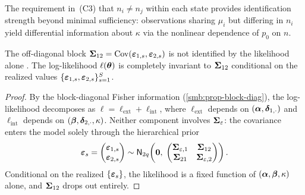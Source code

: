 \begin{remark}
\label{smb:rem-trial-variation}
  The requirement in~\textup{(C3)} that $n_i \ne n_j$ within each state
  provides identification strength beyond minimal sufficiency: observations
  sharing $\mu_i$ but differing in $n_i$ yield differential information
  about $\kappa$ via the nonlinear dependence of $p_0$ on $n$.
\end{remark}


\begin{proposition}\label{smb:prop-sigma12-nonid}
  The off-diagonal block
  $\boldsymbol{\Sigma}_{12} = \operatorname*{Cov}(\boldsymbol{\varepsilon}_{1,s}, \boldsymbol{\varepsilon}_{2,s})$ is not
  identified by the likelihood alone
  \citep[cf.~the analogous discussion
  in][Section~3.1]{GhosalEtAl2020}. The log-likelihood $\ell(\boldsymbol{\theta})$
  is completely invariant to $\boldsymbol{\Sigma}_{12}$ conditional on the realized
  values $\{\boldsymbol{\varepsilon}_{1,s}, \boldsymbol{\varepsilon}_{2,s}\}_{s=1}^S$.
\end{proposition}

\begin{proof}
  By the block-diagonal Fisher information
  (\cref{smb:prop-block-diag}), the log-likelihood decomposes as
  $\ell = \ell_{\mathrm{ext}} + \ell_{\mathrm{int}}$, where
  $\ell_{\mathrm{ext}}$ depends on $(\boldsymbol{\alpha}, \boldsymbol{\delta}_{1,\cdot})$ and
  $\ell_{\mathrm{int}}$ depends on
  $(\boldsymbol{\beta}, \boldsymbol{\delta}_{2,\cdot}, \kappa)$. Neither component involves
  $\boldsymbol{\Sigma}_\varepsilon$: the covariance enters the model solely through
  the hierarchical prior
  \[
    \boldsymbol{\varepsilon}_s
    = \begin{pmatrix}\boldsymbol{\varepsilon}_{1,s}\\\boldsymbol{\varepsilon}_{2,s}\end{pmatrix}
    \sim \textsf{N}_{2q}\!\left(\mathbf{0},\;
      \begin{pmatrix}
        \boldsymbol{\Sigma}_{\varepsilon,1} & \boldsymbol{\Sigma}_{12}\\
        \boldsymbol{\Sigma}_{21} & \boldsymbol{\Sigma}_{\varepsilon,2}
      \end{pmatrix}\right).
  \]
  Conditional on the realized $\{\boldsymbol{\varepsilon}_s\}$, the likelihood is a
  fixed function of $(\boldsymbol{\alpha}, \boldsymbol{\beta}, \kappa)$ alone, and
  $\boldsymbol{\Sigma}_{12}$ drops out entirely.
\end{proof}

